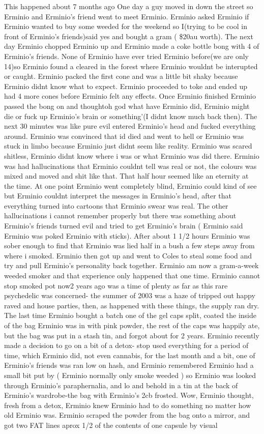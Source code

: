 \documentclass[12pt]{book}
\begin{document}
This happened about 7 months ago One day a guy moved in down the street so Erminio and Erminio's friend went to meet Erminio. Erminio asked Erminio if Erminio wanted to buy some weeded for the weekend so I(trying to be cool in front of Erminio's friends)said yes and bought a gram ( \$20au worth). The next day Erminio chopped Erminio up and Erminio made a coke bottle bong with 4 of Erminio's friends. None of Erminio have ever tried Erminio before(we are only 14)so Erminio found a cleared in the forest where Erminio wouldnt be interupted or caught. Erminio packed the first cone and was a little bit shaky because Erminio didnt know what to expect. Erminio proceeded to toke and ended up had 4 more cones before Erminio felt any effects. Once Erminio finished Erminio passed the bong on and thoughtoh god what have Erminio did, Erminio might die or fuck up Erminio's brain or something'(I didnt know much back then). The next 30 minutes was like pure evil entered Erminio's head and fucked everything around. Erminio was convinced that id died and went to hell or Erminio was stuck in limbo because Erminio just didnt seem like reality. Erminio was scared shitless, Erminio didnt know where i was or what Erminio was did there. Erminio was had hallucinations that Erminio couldnt tell was real or not, the colours was mixed and moved and shit like that. That half hour seemed like an eternity at the time. At one point Erminio went completely blind, Erminio could kind of see but Erminio couldnt interpret the messages in Erminio's head, after that everything turned into cartoons that Erminio swear was real. The other hallucinations i cannot remember properly but there was something about Erminio's friends turned evil and tried to get Erminio's brain ( Erminio said Erminio was poked Erminio with sticks). After about 1 1/2 hours Erminio was sober enough to find that Erminio was lied half in a bush a few steps away from where i smoked. Erminio then got up and went to Coles to steal some food and try and pull Erminio's personality back together. Erminio am now a gram-a-week weeded smoker and that experience only happened that one time. Erminio cannot stop smoked pot now2 years ago was a time of plenty as far as this rare psychedelic was concerned- the summer of 2003 was a haze of tripped out happy raved and house parties, then, as happened with these things, the supply ran dry. The last time Erminio bought a batch one of the gel caps split, coated the inside of the bag Erminio was in with pink powder, the rest of the caps was happily ate, but the bag was put in a stash tin, and forgot about for 2 years. Erminio recently made a decision to go on a bit of a detox- stop used everything for a period of time, which Erminio did, not even cannabis, for the last month and a bit, one of Erminio's friends was ran low on hash, and Erminio remembered Erminio had a small bit put by ( Erminio normally only smoke weeded ) so Erminio was looked through Erminio's paraphernalia, and lo and behold in a tin at the back of Erminio's wardrobe-the bag with Erminio's 2cb frosted. Wow, Erminio thought, fresh from a detox, Erminio knew Erminio had to do something no matter how old Erminio was. Erminio scraped the powder from the bag onto a mirror, and got two FAT lines aprox 1/2 of the contents of one capsule by visual 
\end{document}

